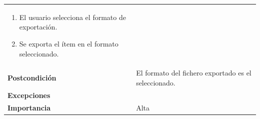 \documentclass[
]{article}
\providecommand{\tightlist}{%
  \setlength{\itemsep}{0pt}\setlength{\parskip}{0pt}}
\begin{document}
\begin{longtable}[]{@{}ll@{}}
\begin{minipage}[t]{0.69\columnwidth}
\begin{enumerate}
\tightlist
\item
  El usuario selecciona el formato de exportación.
\item
  Se exporta el ítem en el formato seleccionado.
\end{enumerate}\strut
\end{minipage}\tabularnewline
\begin{minipage}[t]{0.25\columnwidth}\raggedright
\textbf{Postcondición}\strut
\end{minipage} & \begin{minipage}[t]{0.69\columnwidth}\raggedright
El formato del fichero exportado es el seleccionado.\strut
\end{minipage}\tabularnewline
\begin{minipage}[t]{0.25\columnwidth}\raggedright
\textbf{Excepciones}\strut
\end{minipage} & \begin{minipage}[t]{0.69\columnwidth}\raggedright
\strut
\end{minipage}\tabularnewline
\begin{minipage}[t]{0.25\columnwidth}\raggedright
\textbf{Importancia}\strut
\end{minipage} & \begin{minipage}[t]{0.69\columnwidth}\raggedright
Alta\strut
\end{minipage}\tabularnewline
\bottomrule
\end{longtable}
\end{document}
